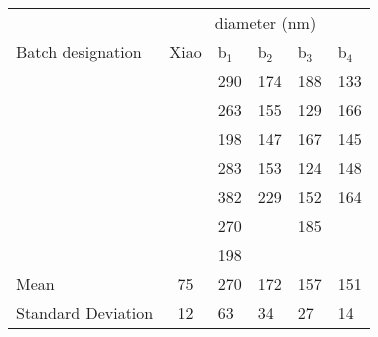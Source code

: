 \begin{tabular}{@{}lcllll@{}}
\toprule
 					& \multicolumn{5}{c}{\np{} diameter (\si{\nano\metre})} \\ \cmidrule(l){2-6} 
Batch designation 	& Xiao \etal{} 	& b$_1$  & b$_2$ & b$_3$ & b$_4$ \\ \midrule
 					&  		& 290 	& 174 	& 188 	& 133 	\\
 					&  		& 263 	& 155 	& 129 	& 166 	\\
 					&  		& 198 	& 147 	& 167 	& 145 	\\
 					&  		& 283 	& 153 	& 124 	& 148 	\\
					&  		& 382 	& 229 	& 152 	& 164 	\\
 					&  		& 270 	&		& 185 	&  		\\
 					&  		& 198 	&  		& 		& 		\\ \midrule
Mean 				& 75 	& 270 	& 172 	& 157 	& 151	\\
Standard Deviation 	& 12 	& 63 	& 34 	& 27 	& 14		\\ \bottomrule
\end{tabular}